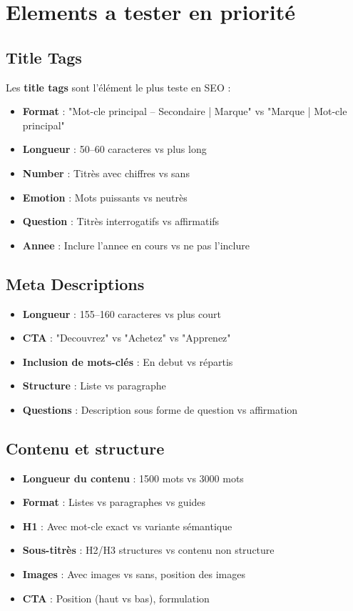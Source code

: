 \documentclass[12pt,a4paper,twoside]{report}
\newcommand{\keyword}[1]{\textbf{\textcolor{googleblue}{#1}}}
\begin{document}
\section{Elements a tester en priorité}

\subsection{Title Tags}

Les \keyword{title tags} sont l'élément le plus teste en SEO :

\begin{itemize}
    \item \textbf{Format} : "Mot-cle principal -- Secondaire | Marque" vs "Marque | Mot-cle principal"
    \item \textbf{Longueur} : 50--60 caracteres vs plus long
    \item \textbf{Number} : Titrès avec chiffres vs sans
    \item \textbf{Emotion} : Mots puissants vs neutrès
    \item \textbf{Question} : Titrès interrogatifs vs affirmatifs
    \item \textbf{Annee} : Inclure l'annee en cours vs ne pas l'inclure
\end{itemize}

\subsection{Meta Descriptions}

\begin{itemize}
    \item \textbf{Longueur} : 155--160 caracteres vs plus court
    \item \textbf{CTA} : "Decouvrez" vs "Achetez" vs "Apprenez"
    \item \textbf{Inclusion de mots-clés} : En debut vs répartis
    \item \textbf{Structure} : Liste vs paragraphe
    \item \textbf{Questions} : Description sous forme de question vs affirmation
\end{itemize}

\subsection{Contenu et structure}

\begin{itemize}
    \item \textbf{Longueur du contenu} : 1500 mots vs 3000 mots
    \item \textbf{Format} : Listes vs paragraphes vs guides
    \item \textbf{H1} : Avec mot-cle exact vs variante sémantique
    \item \textbf{Sous-titrès} : H2/H3 structures vs contenu non structure
    \item \textbf{Images} : Avec images vs sans, position des images
    \item \textbf{CTA} : Position (haut vs bas), formulation
\end{itemize}
\end{document}
